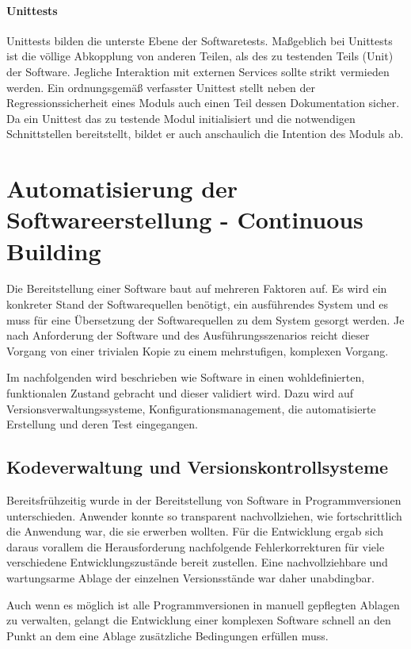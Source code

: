 \documentclass[12pt,a4paper]{book}
\begin{document}
\paragraph{Unittests}

Unittests bilden die unterste Ebene der Softwaretests. Maßgeblich bei Unittests ist die völlige Abkopplung von anderen Teilen, als des zu testenden Teils (Unit) der Software. Jegliche Interaktion mit externen Services sollte strikt vermieden werden.
Ein ordnungsgemäß verfasster Unittest stellt neben der Regressionssicherheit eines Moduls auch einen Teil dessen Dokumentation sicher. Da ein Unittest das zu testende Modul initialisiert und die notwendigen Schnittstellen bereitstellt, bildet er auch anschaulich die Intention des Moduls ab.

\section{Automatisierung der Softwareerstellung - Continuous Building}

Die Bereitstellung einer Software baut auf mehreren Faktoren auf. Es wird ein konkreter Stand der Softwarequellen benötigt, ein ausführendes System und es muss für eine Übersetzung der Softwarequellen zu dem System gesorgt werden.
Je nach Anforderung der Software und des Ausführungsszenarios reicht dieser Vorgang von einer trivialen Kopie zu einem mehrstufigen, komplexen Vorgang. 

Im nachfolgenden wird beschrieben wie Software in einen wohldefinierten, funktionalen Zustand gebracht und dieser validiert wird. Dazu wird auf Versionsverwaltungssysteme, Konfigurationsmanagement, die automatisierte Erstellung und deren Test eingegangen.

\subsection{Kodeverwaltung und Versionskontrollsysteme}

Bereitsfrühzeitig wurde in der Bereitstellung von Software in Programmversionen unterschieden. Anwender konnte so transparent nachvollziehen, wie fortschrittlich die Anwendung war, die sie erwerben wollten.
Für die Entwicklung ergab sich daraus vorallem die Herausforderung nachfolgende Fehlerkorrekturen für viele verschiedene Entwicklungszustände bereit zustellen.
Eine nachvollziehbare und wartungsarme Ablage der einzelnen Versionsstände war daher unabdingbar.

Auch wenn es möglich ist alle Programmversionen in manuell gepflegten Ablagen zu verwalten, gelangt die Entwicklung einer komplexen Software schnell an den Punkt an dem eine Ablage zusätzliche Bedingungen erfüllen muss.
\end{document}

